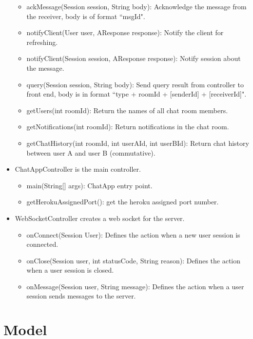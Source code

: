 \documentclass[letterpaper, 11pt]{article}
\begin{document}
\begin{itemize}
\begin{itemize}
\item ackMessage(Session session, String body): Acknowledge the message from the receiver, body is of format ``msgId".
\item notifyClient(User user, AResponse response): Notify the client for refreshing.
\item notifyClient(Session session, AResponse response): Notify session about the message.
\item query(Session session, String body): Send query result from controller to front end, body is in format ``type + roomId + [senderId] + [receiverId]".
\item getUsers(int roomId): Return the names of all chat room members.
\item getNotifications(int roomId): Return notifications in the chat room.
\item getChatHistory(int roomId, int userAId, int userBId): Return chat history between user A and user B (commutative).
\end{itemize}

\item ChatAppController is the main controller.
\begin{itemize}
  \item main(String[] args): ChatApp entry point.
  \item getHerokuAssignedPort(): get the heroku assigned port number.
\end{itemize}

\item WebSocketController creates a web socket for the server. 
\begin{itemize}
 \item onConnect(Session User): Defines the action when a new user session is connected.
\item onClose(Session user, int statusCode, String reason): Defines the action when a user session is closed.
\item onMessage(Session user, String message): Defines the action when a user session sends messages to the server.
\end{itemize}
\end{itemize}

\section{Model}
\end{document}
